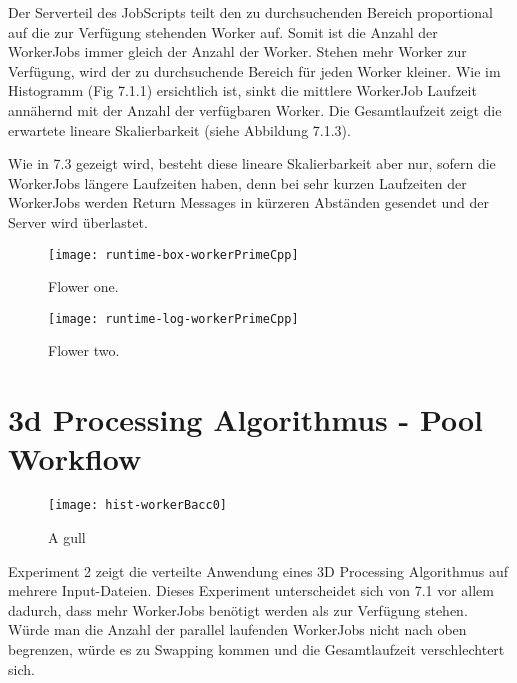Der Serverteil des JobScripts teilt den zu durchsuchenden Bereich proportional auf die zur Verfügung stehenden Worker auf.
Somit ist die Anzahl der WorkerJobs immer gleich der Anzahl der Worker.
Stehen mehr Worker zur Verfügung, wird der zu durchsuchende Bereich für jeden Worker kleiner.
Wie im Histogramm (Fig 7.1.1) ersichtlich ist, sinkt die mittlere WorkerJob Laufzeit annähernd mit der Anzahl der verfügbaren Worker.
Die Gesamtlaufzeit zeigt die erwartete lineare Skalierbarkeit (siehe Abbildung 7.1.3).

Wie in 7.3 gezeigt wird, besteht diese lineare Skalierbarkeit aber nur, sofern die WorkerJobs längere Laufzeiten haben, denn bei sehr kurzen Laufzeiten der WorkerJobs werden Return Messages in kürzeren Abständen gesendet und der Server wird überlastet.


\vspace{85mm}

\begin{figure}[H]
  \centering
  \begin{minipage}[b]{0.45\textwidth}
    \texttt{[image: runtime-box-workerPrimeCpp]}
    \caption{Flower one.}
  \end{minipage}
  \hfill
  \begin{minipage}[b]{0.45\textwidth}
    \texttt{[image: runtime-log-workerPrimeCpp]}
    \caption{Flower two.}
  \end{minipage}
\end{figure}






\clearpage
\section{3d Processing Algorithmus - Pool Workflow}

\begin{wrapfigure}{r}{0.42\textwidth}
  \vspace{-20pt}
  \begin{center}
    \texttt{[image: hist-workerBacc0]}
  \end{center}
  \caption{A gull}
\end{wrapfigure}

Experiment 2 zeigt die verteilte Anwendung eines 3D Processing Algorithmus auf mehrere Input-Dateien.
Dieses Experiment unterscheidet sich von 7.1 vor allem dadurch, dass mehr WorkerJobs benötigt werden als zur Verfügung stehen.
Würde man die Anzahl der parallel laufenden WorkerJobs nicht  nach oben begrenzen, würde es zu Swapping kommen und die Gesamtlaufzeit verschlechtert sich.

